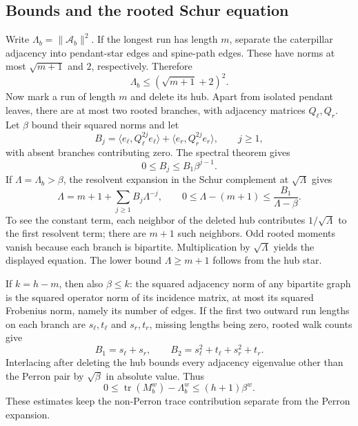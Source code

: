 \documentclass[11pt,letterpaper]{article}
\numberwithin{equation}{section}
\theoremstyle{remark}\newtheorem{remark}[theorem]{Remark}
\DeclareMathOperator{\tr}{tr}\DeclareMathOperator{\TV}{TV}
\begin{document}
\subsection{Bounds and the rooted Schur equation}
Write $\Lambda_b=\|\mathcal A_b\|^2$. If the longest run has length $m$, separate the caterpillar adjacency into pendant-star edges and spine-path edges. These have norms at most $\sqrt{m+1}$ and $2$, respectively. Therefore
\begin{equation}\label{mdk:asp:eq:norm}
\Lambda_b\le(\sqrt{m+1}+2)^2.
\end{equation}
Now mark a run of length $m$ and delete its hub. Apart from isolated pendant leaves, there are at most two rooted branches, with adjacency matrices $Q_\ell,Q_r$. Let $\beta$ bound their squared norms and let
\[
B_j=\langle e_\ell,Q_\ell^{2j}e_\ell\rangle+
     \langle e_r,Q_r^{2j}e_r\rangle,\qquad j\ge1,
\]
with absent branches contributing zero. The spectral theorem gives
\begin{equation}\label{mdk:asp:eq:moments}
0\le B_j\le B_1\beta^{j-1}.
\end{equation}
If $\Lambda=\Lambda_b>\beta$, the resolvent expansion in the Schur complement at $\sqrt\Lambda$ gives
\begin{equation}\label{mdk:asp:eq:schur}
\Lambda=m+1+\sum_{j\ge1}B_j\Lambda^{-j},\qquad
0\le\Lambda-(m+1)\le\frac{B_1}{\Lambda-\beta}.
\end{equation}
To see the constant term, each neighbor of the deleted hub contributes $1/\sqrt\Lambda$ to the first resolvent term; there are $m+1$ such neighbors. Odd rooted moments vanish because each branch is bipartite. Multiplication by $\sqrt\Lambda$ yields the displayed equation. The lower bound $\Lambda\ge m+1$ follows from the hub star.

If $k=h-m$, then also $\beta\le k$: the squared adjacency norm of any bipartite graph is the squared operator norm of its incidence matrix, at most its squared Frobenius norm, namely its number of edges. If the first two outward run lengths on each branch are $s_\ell,t_\ell$ and $s_r,t_r$, missing lengths being zero, rooted walk counts give
\begin{equation}\label{mdk:asp:eq:B12}
B_1=s_\ell+s_r,\qquad B_2=s_\ell^2+t_\ell+s_r^2+t_r.
\end{equation}
Interlacing after deleting the hub bounds every adjacency eigenvalue other than the Perron pair by $\sqrt\beta$ in absolute value. Thus
\begin{equation}\label{mdk:asp:eq:nonperron}
0\le\tr(M_b^w)-\Lambda_b^w\le(h+1)\beta^w.
\end{equation}
These estimates keep the non-Perron trace contribution separate from the Perron expansion.
\end{document}

